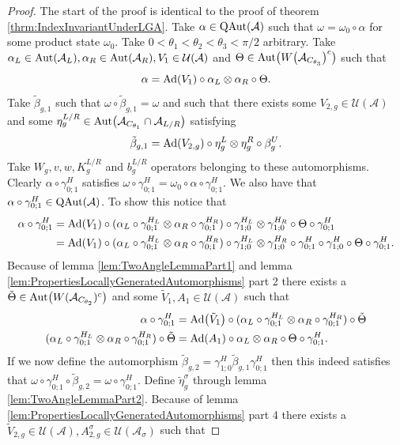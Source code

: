 \documentclass[12pt,a4paper,twoside]{article}
\let\originalleft\left
\let\originalright\right
\renewcommand{\left}{\mathopen{}\mathclose\bgroup\originalleft}
\renewcommand{\right}{\aftergroup\egroup\originalright}
\newcommand{\UU}{\mathcal U}
\renewcommand{\AA}{\mathcal A}
\newcommand{\Ad}[1]{\textrm{Ad}\left(#1\right)}
\newcommand{\Aut}[1]{\textrm{Aut}\left(#1\right)}
\newcommand{\QAut}[1]{\textrm{QAut}\left(#1\right)}
\theoremstyle{definition}
\numberwithin{equation}{section}
\begin{document}
\begin{proof}
	The start of the proof is identical to the proof of theorem \ref{thrm:IndexInvariantUnderLGA}. Take $\alpha\in\QAut{\AA}$ such that $\omega=\omega_0\circ\alpha$ for some product state $\omega_0$. Take $0<\theta_1<\theta_2<\theta_3<\pi/2$ arbitrary. Take $\alpha_L\in\Aut{\AA_L},\alpha_R\in\Aut{\AA_R},V_1\in\UU(\AA)$ and $\Theta\in\Aut{W\left(\AA_{C_{\theta_3}}\right)^c}$ such that
	\begin{equation}
		\alpha=\Ad{V_1}\circ\alpha_L\otimes\alpha_R\circ\Theta.
	\end{equation}
	Take $\tilde{\beta}_{g,1}$ such that $\omega\circ\tilde{\beta}_{g,1}=\omega$ and such that there exists some $V_{2,g}\in\UU(\AA)$ and some $\eta_g^{L/R}\in\Aut{\AA_{C_{\theta_1}}\cap\AA_{L/R}}$ satisfying
	\begin{equation}
		\tilde{\beta}_{g,1}=\Ad{V_{2,g}}\circ\eta_{g}^L\otimes\eta_{g}^R\circ\beta_g^U.
	\end{equation}
	Take $W_g,v,w,K_g^{L/R}$ and $b_g^{L/R}$ operators belonging to these automorphisms. Clearly $\alpha\circ\gamma^H_{0;1}$ satisfies $\omega\circ\gamma^{H}_{0;1}=\omega_0\circ\alpha\circ\gamma^{H}_{0;1}$. We also have that $\alpha\circ\gamma^H_{0;1}\in\QAut{\AA}$. To show this notice that
	\begin{align}
		\alpha\circ\gamma^H_{0;1}&=\Ad{V_1}\circ(\alpha_L\circ\gamma^{H_L}_{0;1}\otimes\alpha_R\circ\gamma^{H_R}_{0;1})\circ\gamma^{H_L}_{1;0}\otimes\gamma^{H_R}_{1;0}\circ\Theta\circ\gamma^H_{0;1}\\
		&=\Ad{V_1}\circ(\alpha_L\circ\gamma^{H_L}_{0;1}\otimes\alpha_R\circ\gamma^{H_R}_{0;1})\circ\gamma^{H_L}_{1;0}\otimes\gamma^{H_R}_{1;0}\circ\gamma^{H}_{0;1}\circ\gamma^{H}_{1;0}\circ\Theta\circ\gamma^H_{0;1}.
	\end{align}
	Because of lemma \ref{lem:TwoAngleLemmaPart1} and lemma \ref{lem:PropertiesLocallyGeneratedAutomorphisms} part 2 there exists a $\tilde{\Theta}\in\Aut{W(\AA_{C_{\theta_2}})^c}$ and some $\tilde V_1,A_1\in\UU(\AA)$ such that
	\begin{align}
		\alpha\circ\gamma^H_{0;1}&=\Ad{\tilde V_1}\circ(\alpha_L\circ\gamma^{H_L}_{0;1}\otimes\alpha_R\circ\gamma^{H_R}_{0;1})\circ\tilde\Theta\\
		(\alpha_L\circ\gamma^{H_L}_{0;1}\otimes\alpha_R\circ\gamma^{H_R}_{0;1})\circ\tilde\Theta&=\Ad{A_1}\circ \alpha_L\otimes\alpha_R\circ\Theta\circ\gamma^{H}_{0;1}.
	\end{align}
	If we now define the automorphism $\tilde{\beta}_{g,2}=\gamma^{H}_{1;0}\tilde\beta_{g,1}\gamma^{H}_{0;1}$ then this indeed satisfies that $\omega\circ\gamma^{H}_{0;1}\circ\tilde{\beta}_{g,2}=\omega\circ\gamma^{H}_{0;1}$. Define $\tilde\eta_g^\sigma$ through lemma \ref{lem:TwoAngleLemmaPart2}. Because of lemma \ref{lem:PropertiesLocallyGeneratedAutomorphisms} part 4 there exists a $\tilde V_{2,g}\in\UU(\AA),A_{2,g}^{\sigma}\in\UU(\AA_\sigma)$ such that

\end{proof}
\end{document}
